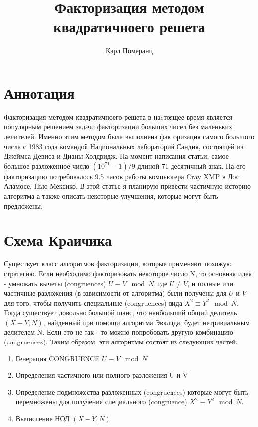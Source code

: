 \documentclass[russian, utf8, a4paper,12pt]{report}
\title{Факторизация методом квадратичноего решета}
\author{Карл Померанц}
\begin{document}
\maketitle

\newcommand{\sus }{$U \equiv V \mod N$}

\section{Аннотация}

Факторизация методом квадратичноего решета в наcтоящее время является популярным решением задачи факторизации больших чисел без маленьких делителей. Именно этим методом была выполнена факторизация самого большого числа с 1983 года командой Национальных лабораторий Сандия, состоящей из Джеймса Девиса и Дианы Холдридж. На момент написания статьи, самое большое разложенное число $(10^71 - 1)/9$ длиной 71 десятичный знак. На его факторизацию потребовалось 9.5 часов работы компьютера Cray XMP в Лос Аламосе, Нью Мексико. В этой статье я планирую привести частичную историю алгоритма а также описать некоторые улучшения, которые могут быть предложены.

\section{Схема Краичика}

Существует класс алгоритмов факторизации, которые применяют похожую стратегию. Если необходимо факторизовать некоторое число N, то основная идея - умножать вычеты (congruences) $U \equiv V \mod{N}$, где $ U \neq V$, и полные или частичные разложения (в зависимости от алгоритма) были получены для $U$ и $V$ для того, чтобы получить специальные (congruences) вида $X^2 \equiv Y^2 \mod N$. Тогда существует довольно большой шанс, что наибольший общий делитель $(X - Y, N)$, найденный при помощи алгоритма Эвклида, будет нетривиальным делителем N. Если это не так - то можно попробовать другую комбинацию (congruences). Таким образом, эти алгоритмы состоят из следующих частей:

\begin{enumerate}
	\item Генерация CONGRUENCE $U \equiv V \mod N$ \label{itemone}
	\item Определения частичного или полного разложения U и V \label{itemtwo}
	\item Определение подмножества разложенных (congruences) которые могут быть перемножены для получения специального (congruence) $X^2 \equiv Y^2 \mod N$. \label{itemthree}
	\item Вычисление НОД $(X - Y, N)$ \label{itemfour}
\end{enumerate}
\end{document}
